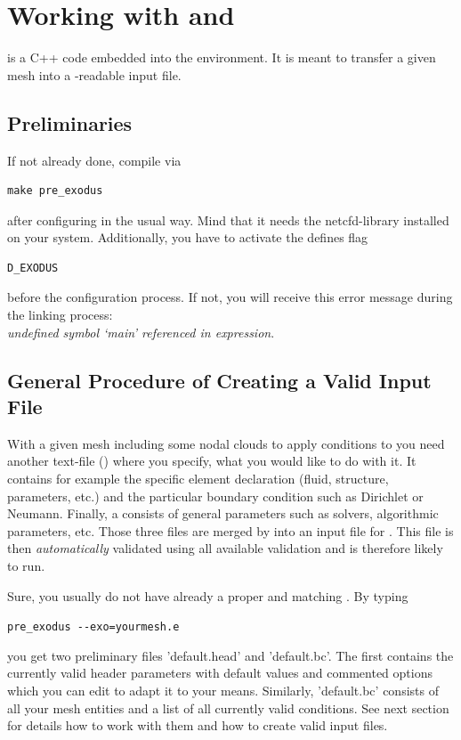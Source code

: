 \section{Working with \prexo and \baci{}}

\prexo is a C++ code embedded into the \baci{} environment. It is meant to
transfer a given mesh into a \baci{}-readable input file.

\subsection{Preliminaries}

If not already done, compile \prexo via \begin{verbatim}make pre_exodus\end{verbatim} after 
configuring \baci{} in the usual way. Mind that it needs the netcfd-library 
installed on your system. Additionally, you have to activate the defines flag
\begin{verbatim}D_EXODUS\end{verbatim}
before the configuration process. If not, you will receive this error
message during the linking process:\\
\emph{undefined symbol `main' referenced in expression}. 

\subsection{General Procedure of Creating a Valid \baci{} Input File}
With a given mesh including some nodal clouds to apply conditions to you need
another text-file (\bc) where you specify, what you would like to do with
it. It contains for example the specific element declaration (fluid, structure,
parameters, etc.) and the particular boundary condition such as Dirichlet or
Neumann. Finally, a \head consists of general parameters such as
solvers, algorithmic parameters, etc. Those three files are merged by \prexo
into an input file for \baci{}. This file is then \emph{automatically} validated
using all available \baci{} validation and is therefore likely to run.

Sure, you usually do not have already a proper \head and matching \bc. By
typing
\begin{center}
  \verb|pre_exodus --exo=yourmesh.e|
\end{center}
you get two preliminary files
'default.head' and 'default.bc'. The first contains the currently valid header
parameters with default values and commented options which you can edit to
adapt it to your means. Similarly, 'default.bc' consists of all your mesh
entities and a list of all currently valid conditions. See next section for
details how to work with them and how to create valid input files.


